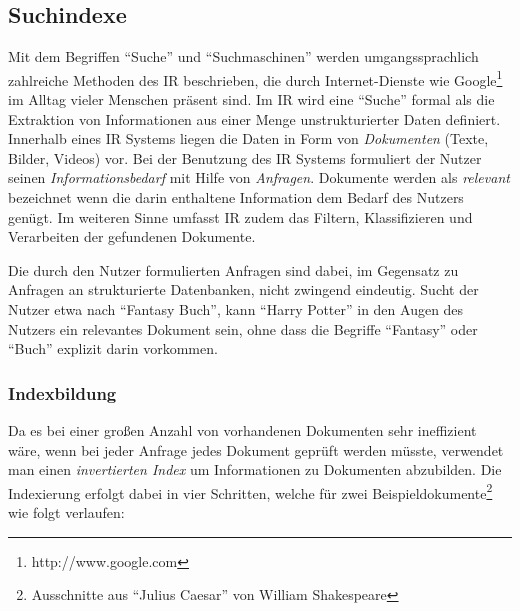 \subsection{Suchindexe}
\label{sec:search}

Mit dem Begriffen ``Suche'' und ``Suchmaschinen'' werden umgangssprachlich zahlreiche Methoden des  \ac{IR} beschrieben, die durch Internet-Dienste wie Google\footnote{http://www.google.com} im Alltag vieler Menschen präsent sind. Im \acs{IR} wird eine ``Suche'' formal als die Extraktion von Informationen aus einer Menge unstrukturierter Daten definiert. Innerhalb eines \acs{IR} Systems liegen die Daten in Form von \textit{Dokumenten} (Texte, Bilder, Videos) vor. Bei der Benutzung des \acs{IR} Systems formuliert der Nutzer seinen \textit{Informationsbedarf} mit Hilfe von \textit{Anfragen}. Dokumente werden als \textit{relevant} bezeichnet wenn die darin enthaltene Information dem Bedarf des Nutzers genügt. Im weiteren Sinne umfasst \acs{IR} zudem das Filtern, Klassifizieren und Verarbeiten der gefundenen Dokumente.

Die durch den Nutzer formulierten Anfragen sind dabei, im Gegensatz zu Anfragen an strukturierte Datenbanken, nicht zwingend eindeutig. Sucht der Nutzer etwa nach ``Fantasy Buch'', kann ``Harry Potter'' in den Augen des Nutzers ein relevantes Dokument sein, ohne dass die Begriffe ``Fantasy'' oder ``Buch'' explizit darin vorkommen. \citep{Manning2008} %

\subsubsection{Indexbildung} \label{sec:indexcreation}

Da es bei einer großen Anzahl von vorhandenen Dokumenten sehr ineffizient wäre, wenn bei jeder Anfrage jedes Dokument geprüft werden müsste, verwendet man einen \textit{invertierten Index} um Informationen zu Dokumenten abzubilden. Die Indexierung erfolgt dabei in vier Schritten, welche für zwei Beispieldokumente\footnote{Ausschnitte aus ``Julius Caesar'' von William Shakespeare} wie folgt verlaufen:


